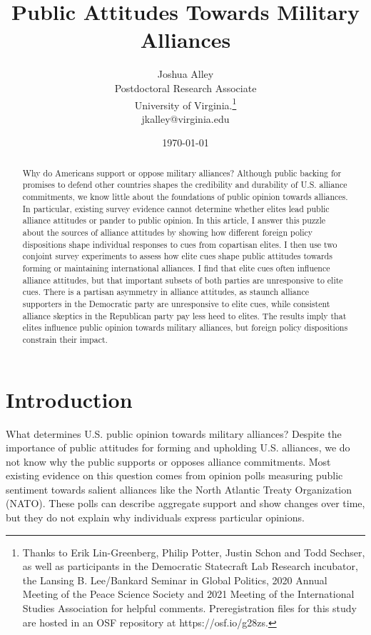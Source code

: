 \documentclass[12pt]{article}
\title{\textbf{Public Attitudes Towards Military Alliances}}
\author{Joshua Alley \\
Postdoctoral Research Associate \\
University of Virginia.\thanks{Thanks to Erik Lin-Greenberg, Philip Potter, Justin Schon and Todd Sechser, as well as participants in the Democratic Statecraft Lab Research incubator, the Lansing B. Lee/Bankard Seminar in Global Politics, 2020 Annual Meeting of the Peace Science Society and 2021 Meeting of the International Studies Association for helpful comments. Preregistration files for this study are hosted in an OSF repository at https://osf.io/g28zs.} \\
jkalley@virginia.edu
}
\date{\today}
\begin{document}
\maketitle 

\doublespace 

\begin{abstract}
Why do Americans support or oppose military alliances? 
Although public backing for promises to defend other countries shapes the credibility and durability of U.S. alliance commitments, we know little about the foundations of public opinion towards alliances.
In particular, existing survey evidence cannot determine whether elites lead public alliance attitudes or pander to public opinion. 
In this article, I answer this puzzle about the sources of alliance attitudes by showing how different foreign policy dispositions shape individual responses to cues from copartisan elites. 
I then use two conjoint survey experiments to assess how elite cues shape public attitudes towards forming or maintaining international alliances.  
I find that elite cues often influence alliance attitudes, but that important subsets of both parties are unresponsive to elite cues. 
There is a partisan asymmetry in alliance attitudes, as staunch alliance supporters in the Democratic party are unresponsive to elite cues, while consistent alliance skeptics in the Republican party pay less heed to elites.  
The results imply that elites influence public opinion towards military alliances, but foreign policy dispositions constrain their impact.  
\end{abstract}


\newpage 


\section{Introduction}

What determines U.S. public opinion towards military alliances? 
Despite the importance of public attitudes for forming and upholding U.S. alliances, we do not know why the public supports or opposes alliance commitments. 
Most existing evidence on this question comes from opinion polls measuring public sentiment towards salient alliances like the North Atlantic Treaty Organization (NATO).
These polls can describe aggregate support and show changes over time, but they do not explain why individuals express particular opinions. 
\end{document}
